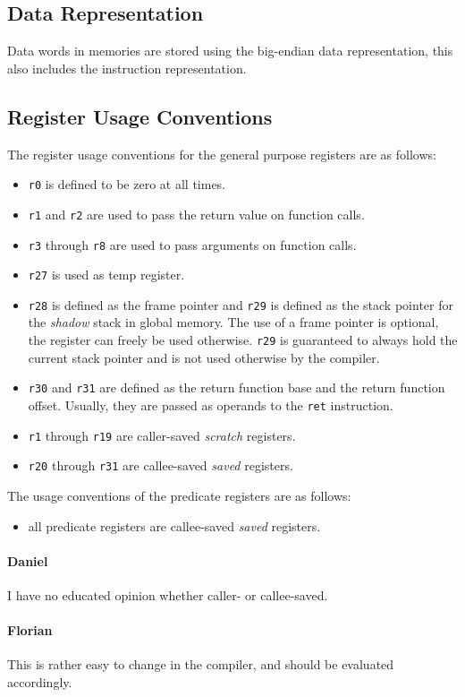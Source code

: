\documentclass{IEEEtran}
\newcommand{\comment}[3]{\paragraph*{\textbf{#1}}{\color{#3}#2}}
\newcommand{\daniel}[1]{\comment{Daniel}{#1}{RoyalBlue}}
\newcommand{\fb}[1]{\comment{Florian}{#1}{Emerald}}
\begin{document}
\subsection{Data Representation}

Data words in memories are stored using the big-endian data representation, this
also includes the instruction representation.

\subsection{Register Usage Conventions}

The register usage conventions for the general purpose registers are as follows:
\begin{itemize}
  \item \texttt{r0} is defined to be zero at all times.
  \item \texttt{r1} and \texttt{r2} are used to pass the return value on
        function calls.
  \item \texttt{r3} through \texttt{r8} are used to pass arguments on function
        calls.
  \item \texttt{r27} is used as temp register.
  \item \texttt{r28} is defined as the frame pointer and \texttt{r29} is defined as the stack
        pointer for the \emph{shadow} stack in global memory. The use of a frame
        pointer is optional, the register can freely be used otherwise. 
	\texttt{r29} is guaranteed to always hold the current stack pointer and is not used 
	otherwise by the compiler.
  \item \texttt{r30} and \texttt{r31} are defined as the return function base
        and the return function offset.
        Usually, they are passed as operands to the \texttt{ret} instruction.
  \item \texttt{r1} through \texttt{r19} are caller-saved \emph{scratch}
        registers.
  \item \texttt{r20} through \texttt{r31} are callee-saved \emph{saved}
        registers.
\end{itemize}

The usage conventions of the predicate registers are as follows:
\begin{itemize}
  \item all predicate registers are callee-saved \emph{saved} registers.
\end{itemize}

\daniel{I have no educated opinion whether caller- or callee-saved.}
\fb{This is rather easy to change in the compiler, and should be evaluated
accordingly.}
\end{document}
